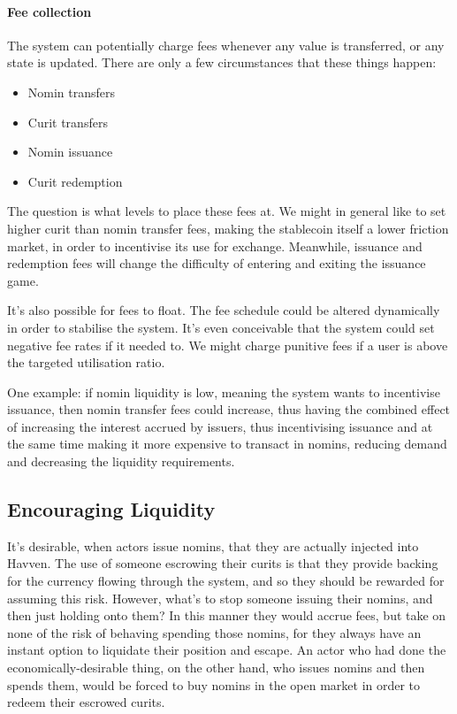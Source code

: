 \documentclass{article}
\begin{document}
\paragraph{Fee collection}
The system can potentially charge fees whenever any value is transferred, or any state is updated.
There are only a few circumstances that these things happen:
\begin{itemize}
    \item Nomin transfers
    \item Curit transfers
    \item Nomin issuance
    \item Curit redemption
\end{itemize}

The question is what levels to place these fees at. We might in general like to set
higher curit than nomin transfer fees, making the stablecoin itself a lower friction market,
in order to incentivise its use for exchange. Meanwhile, issuance and redemption fees will
change the difficulty of entering and exiting the issuance game.

It's also possible for fees to float. The fee schedule could be altered dynamically in order
to stabilise the system. It's even conceivable that the system could set negative fee rates if it needed to.
We might charge punitive fees if a user is above the targeted utilisation ratio.

One example: if nomin liquidity is low, meaning the system wants to incentivise issuance,
then nomin transfer fees could increase, thus having the combined effect of increasing the interest accrued
by issuers, thus incentivising issuance and at the same time making it more expensive to transact in nomins,
reducing demand and decreasing the liquidity requirements.


\pagebreak
\subsection{Encouraging Liquidity}

It's desirable, when actors issue nomins, that they are actually injected into Havven.
The use of someone escrowing their curits is that they provide backing for the currency flowing through the system,
and so they should be rewarded for assuming this risk.
However, what's to stop someone issuing their nomins, and then just holding onto them? In this manner they
would accrue fees, but take on none of the risk of behaving spending those nomins, for they always have an instant
option to liquidate their position and escape. An actor who had done the economically-desirable thing, on
the other hand, who issues nomins and then spends them, would be forced to buy nomins in the open market in
order to redeem their escrowed curits.
\end{document}
